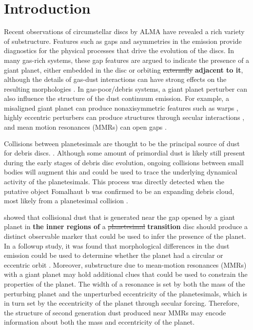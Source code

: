 \documentclass[fleqn,usenatbib]{mnras}
\begin{document}
\section{Introduction} \label{sec:intro}

Recent observations of circumstellar discs by ALMA have revealed a rich variety of substructure. Features such as gaps and asymmetries 
\citep{2015ApJ...808L...3A, 2016Sci...353.1519P, PhysRevLett.117.251101, 2016ApJ...820L..40A, 2016Natur.535..258C} in the emission provide 
diagnostics for the physical processes that drive the evolution of the discs. In many gas-rich systems, these gap features are argued to indicate the 
presence of a giant planet, either embedded in the disc \citep{2015MNRAS.453L..73D} or orbiting \sout{externally} \textbf{adjacent to it}, although the details of gas-dust 
interactions can have strong effects on the resulting morphologies
\citep{2018ApJ...866..110D}. In gas-poor/debris systems, a giant
planet perturber can also influence 
the structure of the dust continuum emission. For example, a misaligned giant planet can produce nonaxisymmetric features such as warps 
\citep{2001A&A...370..447A}, highly eccentric perturbers can produce structures through secular interactions 
\citep{2014MNRAS.443.2541P, 2015MNRAS.448.3679P}, and mean motion resonances (MMRs) can open gaps
\citep{2015ApJ...798...83N, 2016ApJ...818..159T, 2018ApJ...857....3T}.

Collisions between planetesimals are thought to be the principal source of dust for debris discs. \citep[see][]{2008ARA&A..46..339W}.  Although some 
amount of primordial dust is likely still present during the early stages of debris disc evolution, ongoing collisions between small bodies will augment 
this and could be used to trace the underlying dynamical activity of the planetesimals. This process was directly detected when the putative object 
Fomalhaut b was confirmed to be an expanding debris cloud, most likely from a planetesimal collision \citep{2020PNAS..117.9712G}. 

\citet{2013ApJ...777L..31D} showed that collisional dust that is generated near the gap opened by a giant planet in \textbf{the inner regions of} a \sout{planetesimal} \textbf{transition} disc should 
produce a distinct observable marker that could be used to infer the presence of the planet. In a followup study, it was found that morphological 
differences in the dust emission could be used to determine whether the planet had a circular or eccentric orbit \citep{2016ApJ...820...29D}. Moreover, 
substructure due to mean-motion resonances (MMRs) with a giant planet may hold additional clues that could be used to constrain the properties of 
the planet.  The width of a resonance is set by both the mass of the perturbing planet and the unperturbed eccentricity of the planetesimals, 
which is in turn set by the eccentricity of the planet through secular forcing. Therefore, the structure of second generation dust produced near MMRs 
may encode information about both the mass and eccentricity of the planet.
\end{document}
